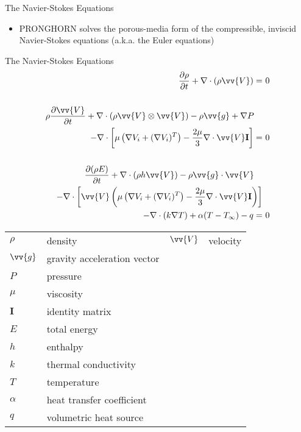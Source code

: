 \documentclass{beamer}
\begin{document}

\begin{frame}{The Navier-Stokes Equations}

\begin{itemize}
\item PRONGHORN solves the porous-media form of the compressible, inviscid Navier-Stokes equations (a.k.a. the Euler equations)
\end{itemize}

\end{frame}


\begin{frame}{The Navier-Stokes Equations}
\small
\begin{equation}
\begin{aligned}
\frac{\partial\rho}{\partial t} + \nabla\cdot(\rho\vv{V})=&\ 0\\
\\
\rho\frac{\partial\vv{V}}{\partial t}+\nabla\cdot(\rho\vv{V}\otimes\vv{V})-\rho \vv{g}+\nabla P \quad&\\
-\nabla\cdot\left\lbrack\mu\left(\nabla V_i+(\nabla V_i)^T\right)-\frac{2\mu}{3}\nabla\cdot\vv{V}\textbf{I}\right\rbrack=&\ 0\\
\\
\frac{\partial (\rho E)}{\partial t}+\nabla\cdot(\rho h\vv{V})-\rho \vv{g}\cdot\vv{V}\quad&\\
-\nabla\cdot\left\lbrack\vv{V}\left(\mu\left(\nabla V_i+(\nabla V_i)^T\right)-\frac{2\mu}{3}\nabla\cdot\vv{V}\textbf{I}\right)\right\rbrack&\quad\\
-\nabla\cdot(k\nabla T)+\alpha(T-T_\infty)-q=&\ 0\\
\end{aligned}
\end{equation}
\normalsize
\begin{tabular}{l l l l}
\(\rho\) & density & \(\vv{V}\) & velocity\\
\(\vv{g}\) & gravity acceleration vector\\
\(P\) & pressure\\
\(\mu\) & viscosity\\
\(\textbf{I}\) & identity matrix\\
\(E\) & total energy\\
\(h\) & enthalpy\\
\(k\) & thermal conductivity\\
\(T\) & temperature\\
\(\alpha\) & heat transfer coefficient\\
\(q\) & volumetric heat source\\
\end{tabular}

\end{frame}
\end{document}

